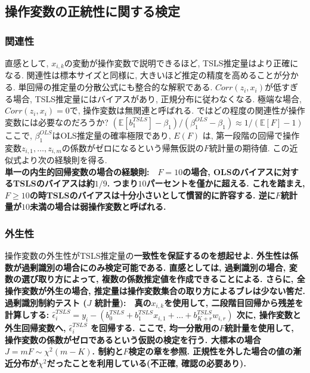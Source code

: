\documentclass[paper=a4paper,fontsize=10pt]{jlreq}
\begin{document}
\subsection{操作変数の正統性に関する検定}
\subsubsection{関連性}
直感として, $x_{i,k}$の変動が操作変数で説明できるほど, TSLS推定量はより正確になる. 関連性は標本サイズと同様に, 大きいほど推定の精度を高めることが分かる. 単回帰の推定量の分散公式にも整合的な解釈である. $Corr(z_i , x_i)$が低すぎる場合, TSLS推定量にはバイアスがあり, 正規分布に従わなくなる. 極端な場合, $Corr(z_i , x_i) = 0$で, 操作変数は無関連と呼ばれる. ではどの程度の関連性が操作変数には必要なのだろうか? $(\mathbb{E}[b_1^{TSLS}] - \beta_1)/(\beta_1^{OLS} - \beta_1) \approx 1/(\mathbb{E}[F] - 1)$ ここで, $\beta_1^{OLS}$はOLS推定量の確率極限であり, $E(F)$ は, 第一段階の回帰で操作変数$z_{i,1}, \dots, z_{i,m}$の係数がゼロになるという帰無仮説の$F$統計量の期待値. この近似式より次の経験則を得る.\\

\rmfamily\mcfamily\bfseries{単一の内生的回帰変数の場合の経験則}\mdseries :　$F = 10$の場合, OLSのバイアスに対するTSLSのバイアスは約$1/9$. つまり$10$パーセントを僅かに超える. これを踏まえ, $F \geq 10$の時TSLSのバイアスは十分小さいとして慣習的に許容する. 逆に$F$統計量が$10$未満の場合は\rmfamily\mcfamily\bfseries{弱操作変数}\mdseries と呼ばれる.\\

\subsubsection{外生性}
操作変数の外生性がTSLS推定量の\rmfamily\mcfamily\bfseries{一致性}\mdseries を保証するのを想起せよ. 外生性は係数が過剰識別の場合にのみ検定可能である. 直感としては, 過剰識別の場合, 変数の選び取り方によって, 複数の係数推定値を作成できることによる. さらに, 全操作変数が外生の場合, 推定量は操作変数集合の取り方によるブレは少ない筈だ.\\

\rmfamily\mcfamily\bfseries{過剰識別制約テスト ($J$ 統計量)}\mdseries :　真の$x_{i,k}$を使用して, 二段階目回帰から残差を計算しする: $\hat{\epsilon}_i^{TSLS} = y_i - (b_0^{TSLS} + b_1^{TSLS} x_{i,1} + \dots + b_{K+r}^{TSLS} w_{i,r})$
次に, 操作変数と外生回帰変数へ, $\hat{\epsilon}_i^{TSLS}$ を回帰する. ここで, \rmfamily\mcfamily\bfseries{均一分散用の}\mdseries $F$統計量を使用して, 操作変数の係数がゼロであるという仮説の検定を行う. 大標本の場合 $J = mF \sim \chi^2(m - K)$. 制約と$F$検定の章を参照. 正規性を外した場合の値の漸近分布が$\chi^2$だったことを利用している(不正確, 確認の必要あり).\\
\end{document}
